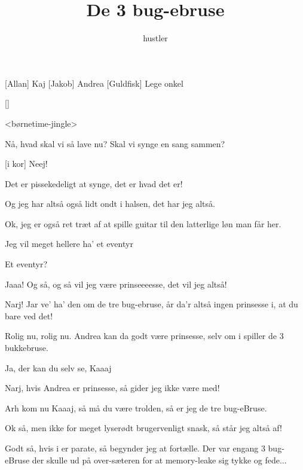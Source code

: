 \documentclass[a4paper,11pt]{article}
\title{De 3 bug-ebruse}
\author{hustler}
\begin{document}
\maketitle

\begin{roles}
[Allan] Kaj
[Jakob] Andrea
[Guldfisk] Lege onkel
\end{roles}

\begin{props}
[]
\end{props}

  
\begin{sketch}

   <børnetime-jingle>

   Nå, hvad skal vi så lave nu?  Skal vi synge en sang sammen?

  [i kor] Neej!

   Det er pissekedeligt at synge, det er hvad det er!

   Og jeg har altså også lidt ondt i halsen, det har jeg altså.

   Ok, jeg er også ret træt af at spille guitar til den latterlige løn
  man får her.  

   Jeg vil meget hellere ha' et eventyr

   Et eventyr?

   Jaaa! Og så, og så vil jeg være prinseeeesse, det vil jeg altså!

   Narj! Jar ve' ha' den om de tre bug-ebruse, år da'r altså ingen
  prinsesse i, at du bare ved det!

   Rolig nu, rolig nu. Andrea kan da godt være prinsesse, selv om i
  spiller de 3 bukkebruse.

   Ja, der kan du selv se, Kaaaj

   Narj, hvis Andrea er prinsesse, så gider jeg ikke være med!

   Arh kom nu Kaaaj, så må du være trolden, så er jeg de tre bug-eBruse.

   Ok så, men ikke for meget lyserødt brugervenligt snask, så står jeg
  altså af!

   Godt så, hvis i er parate, så begynder jeg at fortælle.   Der var engang 3 bug-eBruse der skulle ud på
  over-sæteren for at memory-leake sig tykke og fede...


\end{sketch}
\end{document}
